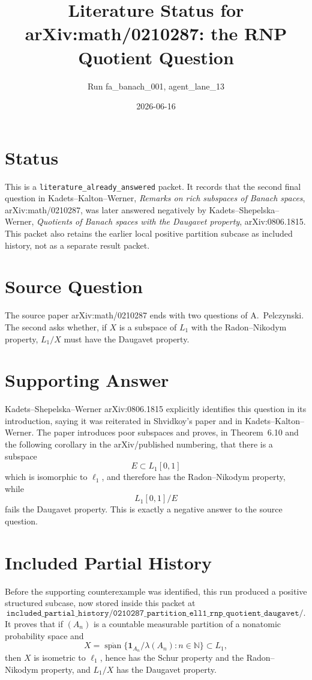 \documentclass[11pt]{article}
\title{Literature Status for arXiv:math/0210287: the RNP Quotient Question}
\author{Run fa\_banach\_001, agent\_lane\_13}
\date{2026-06-16}
\begin{document}
\maketitle

\section*{Status}

This is a \texttt{literature\_already\_answered} packet.  It records that the
second final question in Kadets--Kalton--Werner, \emph{Remarks on rich
subspaces of Banach spaces}, arXiv:math/0210287, was later answered
negatively by Kadets--Shepelska--Werner, \emph{Quotients of Banach spaces with
the Daugavet property}, arXiv:0806.1815.  This packet also retains the earlier
local positive partition subcase as included history, not as a separate result
packet.

\section*{Source Question}

The source paper arXiv:math/0210287 ends with two questions of
A.~Pelczynski.  The second asks whether, if \(X\) is a subspace of \(L_1\) with
the Radon--Nikodym property, \(L_1/X\) must have the Daugavet property.

\section*{Supporting Answer}

Kadets--Shepelska--Werner arXiv:0806.1815 explicitly identifies this question
in its introduction, saying it was reiterated in Shvidkoy's paper and in
Kadets--Kalton--Werner.  The paper introduces poor subspaces and proves, in
Theorem~6.10 and the following corollary in the arXiv/published numbering, that
there is a subspace
\[
  E\subset L_1[0,1]
\]
which is isomorphic to \(\ell_1\), and therefore has the Radon--Nikodym
property, while
\[
  L_1[0,1]/E
\]
fails the Daugavet property.  This is exactly a negative answer to the source
question.

\section*{Included Partial History}

Before the supporting counterexample was identified, this run produced a
positive structured subcase, now stored inside this packet at
\[
\texttt{included\_partial\_history/0210287\_partition\_ell1\_rnp\_quotient\_daugavet/}.
\]
It proves that if \((A_n)\) is a countable measurable partition of a nonatomic
probability space and
\[
  X=\overline{\operatorname{span}}\{\mathbf 1_{A_n}/\lambda(A_n):n\in\mathbb N\}
  \subset L_1,
\]
then \(X\) is isometric to \(\ell_1\), hence has the Schur property and the
Radon--Nikodym property, and \(L_1/X\) has the Daugavet property.
\end{document}
